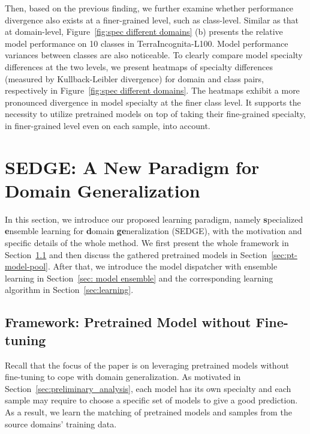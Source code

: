 \documentclass{article}
\begin{document}
Then, based on the previous finding, we further examine whether performance divergence also exists at a finer-grained level, such as class-level.
Similar as that at domain-level, Figure~\ref{fig:spec different domains} (b) presents the relative model performance on 10 classes in TerraIncognita-L100.
Model performance variances between classes are also noticeable.
To clearly compare model specialty differences at the two levels, we present heatmaps of specialty differences (measured by Kullback-Leibler divergence) for domain and class pairs, respectively in Figure~\ref{fig:spec different domains}.
The heatmaps exhibit a more pronounced divergence in model specialty at the finer class level.
It supports the necessity to utilize pretrained models on top of taking their fine-grained specialty, in finer-grained level even on each sample, into account.









\section{SEDGE: A New Paradigm for Domain Generalization}
In this section, we introduce our proposed learning paradigm, namely {\bf s}pecialized {\bf e}nsemble learning for {\bf d}omain {\bf ge}neralization (SEDGE), with the motivation and specific details of the whole method.
We first present the whole framework in Section~\ref{sec:framework} and then discuss the gathered pretrained models in Section~\ref{sec:pt-model-pool}.
After that, we introduce the model dispatcher with ensemble learning in Section~\ref{sec: model ensemble} and the corresponding learning algorithm in Section~\ref{sec:learning}.

\subsection{Framework: Pretrained Model without Fine-tuning}\label{sec:framework}

Recall that the focus of the paper is on leveraging pretrained models without fine-tuning to cope with domain generalization.
As motivated in Section~\ref{sec:preliminary_analysis}, each model has its own specialty and 
each sample may require to choose a specific set of models to give a good prediction. 
As a result, we learn the matching of pretrained models and samples from the source domains' training data.
\end{document}
